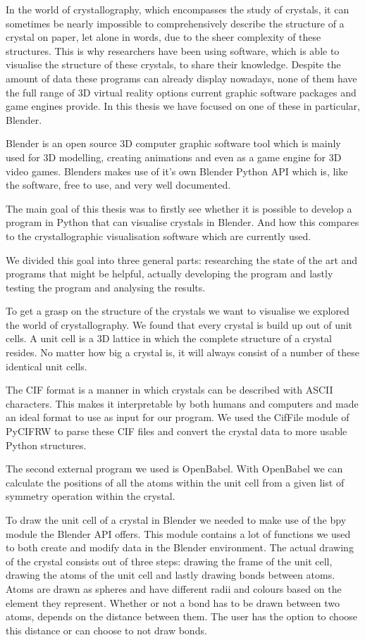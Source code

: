 In the world of crystallography, which encompasses the study of crystals, it can sometimes be nearly impossible to comprehensively describe the structure of a crystal on paper, let alone in words, due to the sheer complexity of these structures. This is why researchers have been using software, which is able to visualise the structure of these crystals, to share their knowledge. Despite the amount of data these programs can already display nowadays, none of them have the full range of 3D virtual reality options current graphic software packages and game engines provide. In this thesis we have focused on one of these in particular, Blender.
\par
Blender is an open source 3D computer graphic software tool which is mainly used for 3D modelling, creating animations and even as a game engine for 3D video games. Blenders makes use of it's own Blender Python API which is, like the software, free to use, and very well documented.
\par
The main goal of this thesis was to firstly see whether it is possible to develop a program in Python that can visualise crystals in Blender. And how this compares to the crystallographic visualisation software which are currently used.
\par
We divided this goal into three general parts: researching the state of the art and programs that might be helpful, actually developing the program and lastly testing the program and analysing the results. 
\par
To get a grasp on the structure of the crystals we want to visualise we explored the world of crystallography. We found that every crystal is build up out of unit cells. A unit cell is a 3D lattice in which the complete structure of a crystal resides. No matter how big a crystal is, it will always consist of a number of these identical unit cells.  
\par
The CIF format is a manner in which crystals can be described with ASCII characters. This makes it interpretable by both humans and computers and made an ideal format to use as input for our program. We used the CifFile module of PyCIFRW to parse these CIF files and convert the crystal data to more usable Python structures.    
\par
The second external program we used is OpenBabel. With OpenBabel we can calculate the positions of all the atoms within the unit cell from a given list of symmetry operation within the crystal. 
\par
To draw the unit cell of a crystal in Blender we needed to make use of the bpy module the Blender API offers. This module contains a lot of functions we used to both create and modify data in the Blender environment. The actual drawing of the crystal consists out of three steps: drawing the frame of the unit cell, drawing the atoms of the unit cell and lastly drawing bonds between atoms. Atoms are drawn as spheres and have different radii and colours based on the element they represent. Whether or not a bond has to be drawn between two atoms, depends on the distance between them. The user has the option to choose this distance or can choose to not draw bonds.
